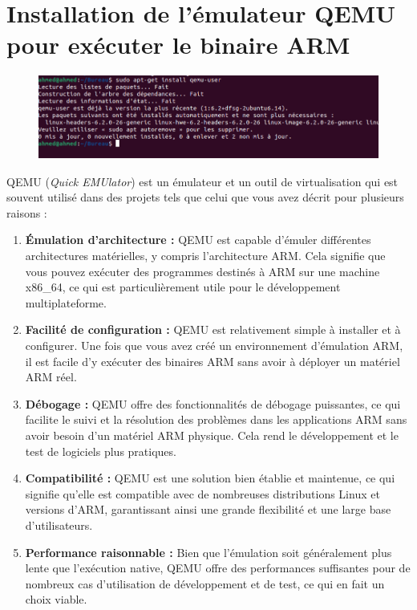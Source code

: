 \section{Installation de l'émulateur QEMU pour exécuter le binaire ARM}
\begin{figure}[h]

    \includegraphics[width=1\textwidth]{images/3.png}

\end{figure}
QEMU (\textit{Quick EMUlator}) est un émulateur et un outil de virtualisation qui est souvent utilisé dans des projets tels que celui que vous avez décrit pour plusieurs raisons :
\begin{enumerate}
    \item \textbf{Émulation d'architecture :} QEMU est capable d'émuler différentes architectures matérielles, y compris l'architecture ARM. Cela signifie que vous pouvez exécuter des programmes destinés à ARM sur une machine x86\_64, ce qui est particulièrement utile pour le développement multiplateforme.
    \item \textbf{Facilité de configuration :} QEMU est relativement simple à installer et à configurer. Une fois que vous avez créé un environnement d'émulation ARM, il est facile d'y exécuter des binaires ARM sans avoir à déployer un matériel ARM réel.
    \item \textbf{Débogage :} QEMU offre des fonctionnalités de débogage puissantes, ce qui facilite le suivi et la résolution des problèmes dans les applications ARM sans avoir besoin d'un matériel ARM physique. Cela rend le développement et le test de logiciels plus pratiques.
    \item \textbf{Compatibilité :} QEMU est une solution bien établie et maintenue, ce qui signifie qu'elle est compatible avec de nombreuses distributions Linux et versions d'ARM, garantissant ainsi une grande flexibilité et une large base d'utilisateurs.
    \item \textbf{Performance raisonnable :} Bien que l'émulation soit généralement plus lente que l'exécution native, QEMU offre des performances suffisantes pour de nombreux cas d'utilisation de développement et de test, ce qui en fait un choix viable.
\end{enumerate}
